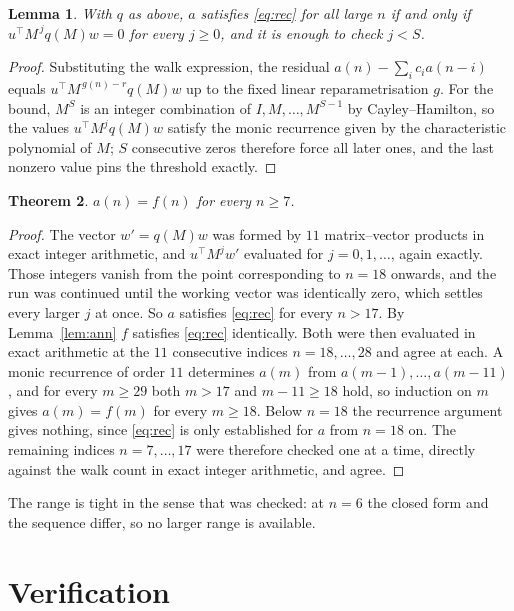 \documentclass[11pt,a4paper]{article}
\theoremstyle{plain}
\newtheorem{theorem}{Theorem}
\newtheorem{lemma}[theorem]{Lemma}
\theoremstyle{definition}
\begin{document}
\begin{lemma}\label{lem:crit}
With $q$ as above, $a$ satisfies \eqref{eq:rec} for all large $n$ if and only if
$u^{\!\top}M^{\,j}q(M)w=0$ for every $j\ge0$, and it is enough to check $j<S$.
\end{lemma}

\begin{proof}
Substituting the walk expression, the residual $a(n)-\sum_ic_ia(n-i)$ equals
$u^{\!\top}M^{\,g(n)-r}q(M)w$ up to the fixed linear reparametrisation $g$. For the bound,
$M^{S}$ is an integer combination of $I,M,\dots,M^{S-1}$ by Cayley--Hamilton, so the values
$u^{\!\top}M^{j}q(M)w$ satisfy the monic recurrence given by the characteristic polynomial of
$M$; $S$ consecutive zeros therefore force all later ones, and the last nonzero value pins the
threshold exactly.
\end{proof}

\begin{theorem}
$a(n)=f(n)$ for every $n\ge7$.
\end{theorem}

\begin{proof}
The vector $w'=q(M)w$ was formed by $11$ matrix--vector products in exact integer
arithmetic, and $u^{\!\top}M^{j}w'$ evaluated for $j=0,1,\dots$, again exactly. Those integers
vanish from the point corresponding to $n=18$ onwards, and the run was continued until the
working vector was identically zero, which settles every larger $j$ at once. So $a$ satisfies
\eqref{eq:rec} for every $n>17$. By Lemma~\ref{lem:ann} $f$ satisfies \eqref{eq:rec}
identically. Both were then evaluated in exact arithmetic at the $11$ consecutive indices
$n=18,\dots,28$ and agree at each. A monic recurrence of order $11$
determines $a(m)$ from $a(m-1),\dots,a(m-11)$, and for every $m\ge29$ both
$m>17$ and $m-11\ge18$ hold, so induction on $m$ gives $a(m)=f(m)$ for every
$m\ge18$.
Below $n=18$ the recurrence argument gives nothing, since \eqref{eq:rec} is only
established for $a$ from $n=18$ on. The remaining indices $n=7,\dots,17$ were
therefore checked one at a time, directly against the walk count in exact integer arithmetic,
and agree.
\end{proof}

The range is tight in the sense that was checked: at $n=6$ the closed form and the sequence differ, so no larger range is available.

\section{Verification}
\end{document}
